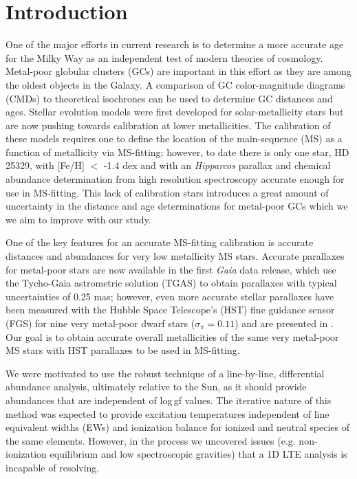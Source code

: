 \documentclass[revtex4]{emulateapj}
\begin{document}

\section{Introduction}
One of the major efforts in current research is to determine a more accurate age for the Milky Way as an independent test of modern theories of cosmology.  Metal-poor globular clusters (GCs) are important in this effort as they are among the oldest objects in the Galaxy.  A comparison of GC color-magnitude diagrams (CMDs) to theoretical isochrones can be used to determine GC distances and  ages.  Stellar evolution models were first developed for solar-metallicity stars but are now pushing towards calibration at lower metallicities.  The calibration of these models requires one to define the location of the main-sequence (MS) as a function of metallicity via MS-fitting; however, to date there is only one star, HD\,25329, with [Fe/H] $<$ -1.4 dex and with an \emph{Hipparcos} parallax \citep{Leeu2007} and chemical abundance determination from high resolution spectroscopy \citep{BS1994} accurate enough for use in MS-fitting.  This lack of calibration stars introduces a great amount of uncertainty in the distance and age determinations for metal-poor GCs which we we aim to improve with our study.

One of the key features for an accurate MS-fitting calibration is accurate distances and abundances for very low metallicity MS stars.  Accurate parallaxes for metal-poor stars are now available in the first \emph{Gaia} data release, which use the Tycho-Gaia astrometric solution (TGAS) \citep{MLH2015,Gaia,Lindegren2016} to obtain parallaxes with typical uncertainties of 0.25 mas; however, even more accurate stellar parallaxes have been measured with the Hubble Space Telescope's (HST) fine guidance sensor (FGS) for nine very metal-poor dwarf stars ($\sigma_\pi = 0.11$) and are presented in \citet{Chab2016}.  Our goal is to obtain accurate overall metallicities of the same very metal-poor MS stars with HST parallaxes to be used in MS-fitting. 

We were motivated to use the robust technique of a line-by-line, differential abundance analysis, ultimately relative to the Sun, as it should provide abundances that are independent of log\,gf values.  The iterative nature of this method was expected to provide excitation temperatures independent of line equivalent widths (EWs) and ionization balance for ionized and neutral species of the same elements.  However, in the process we uncovered issues (e.g. non-ionization equilibrium and low spectroscopic gravities) that a 1D LTE analysis is incapable of resolving.
\end{document}

